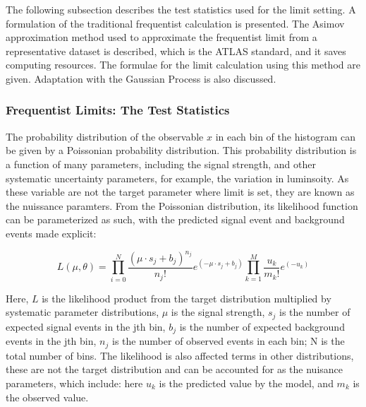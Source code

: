 
The following subsection describes the test statistics used for the limit setting. A formulation of the traditional frequentist calculation is presented. The Asimov approximation method used to approximate the frequentist limit from a representative dataset is described, which is the ATLAS standard, and it saves computing resources. The formulae for the limit calculation using this method are given. Adaptation with the Gaussian Process is also discussed. 

\subsubsection{Frequentist Limits: The Test Statistics}
\label{sec:freqTestStats}

The probability distribution of the observable $x$ in each bin of the histogram can be given by a Poissonian probability distribution. This probability distribution is a function of many parameters, including the signal strength, and other systematic uncertainty parameters, for example, the variation in luminsoity. As these variable are not the target parameter where limit is set, they are known as the nuissance paramters. From the Poissonian distribution, its likelihood function can be parameterized as such, with the predicted signal event and background events made explicit:

\begin{equation}
    L(\mu, \theta) =  \prod_{i=0}^{N} \frac{(\mu \cdot s_{j} + b_{j})^{n_j}}{n_{j}!}e^{(-\mu \cdot s_j + b_j)} \prod_{k=1}^{M}\frac{u_{k}}
{m_{k}!} e^{(-u_{k})}
\label{eq:likelihood}
\end{equation}

Here, $L$ is the likelihood product from the target distribution multiplied by systematic parameter distributions, $\mu$ is the signal strength, $s_j$ is the number of expected signal events in the jth bin, $b_j$ is the number of expected background events in the jth  bin, $n_j$ is the number of observed events in each bin; N is the total number of bins. The likelihood is also affected terms in other distributions, these
are not the target distribution and can be accounted for as the nuisance parameters, which
include: here $u_k$ is the predicted value by the model, and $m_{k}$ is the observed value. 

